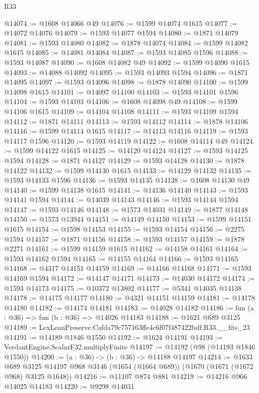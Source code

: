 \begin{lexlean}{R33}
\begin{coremodule}
@14074 := @1608 @14066 @49
@14076 := @1599 @14074 @1615
@14077 := @14072 @14076
@14079 := @1593 @14077 @1594
@14080 := @1871 @14079
@14081 := @1593 @14080
@14082 := @1878 @14074
@14084 := @1599 @14082 @1615
@14085 := @14081 @14084
@14087 := @1593 @14085 @1596
@14088 := @1593 @14087
@14090 := @1608 @14082 @49
@14092 := @1599 @14090 @1615
@14093 := @14088 @14092
@14095 := @1593 @14093 @1594
@14096 := @1871 @14095
@14097 := @1593 @14096
@14098 := @1878 @14090
@14100 := @1599 @14098 @1615
@14101 := @14097 @14100
@14103 := @1593 @14101 @1596
@14104 := @1593 @14103
@14106 := @1608 @14098 @49
@14108 := @1599 @14106 @1615
@14109 := @14104 @14108
@14111 := @1593 @14109 @1594
@14112 := @1871 @14111
@14113 := @1593 @14112
@14114 := @1878 @14106
@14116 := @1599 @14114 @1615
@14117 := @14113 @14116
@14119 := @1593 @14117 @1596
@14120 := @1593 @14119
@14122 := @1608 @14114 @49
@14124 := @1599 @14122 @1615
@14125 := @14120 @14124
@14127 := @1593 @14125 @1594
@14128 := @1871 @14127
@14129 := @1593 @14128
@14130 := @1878 @14122
@14132 := @1599 @14130 @1615
@14133 := @14129 @14132
@14135 := @1593 @14133 @1596
@14136 := @1593 @14135
@14138 := @1608 @14130 @49
@14140 := @1599 @14138 @1615
@14141 := @14136 @14140
@14143 := @1593 @14141 @1594
@14144 := @14039 @14143
@14146 := @1593 @14144 @1594
@14147 := @1593 @14146
@14148 := @1573 @14031
@14149 := @1877 @14148
@14150 := @1573 @13944
@14151 := @14149 @14150
@14153 := @1599 @14151 @1615
@14154 := @1598 @14153
@14155 := @1593 @14154
@14156 := @2275 @1594
@14157 := @1871 @14156
@14158 := @1593 @14157
@14159 := @1878 @2271
@14161 := @1599 @14159 @1615
@14162 := @14158 @14161
@14164 := @1593 @14162 @1594
@14165 := @14155 @14164
@14166 := @1593 @14165
@14168 := @4317 @14151 @14159
@14169 := @14166 @14168
@14171 := @1593 @14169 @1594
@14172 := @14147 @14171
@14173 := @14030 @14172
@14174 := @1593 @14173
@14175 := @10372 @13802
@14177 := @5341 @14035 @14138
@14178 := @14175 @14177
@14180 := @4321 @14151 @14159
@14181 := @14178 @14180
@14182 := @14174 @14181
@14183 := @14028 @14182
@14186 := fun (a : @36) => fun (b : @36) => @14026 @14183
@14188 := @1621 @689 @3125
@14189 := LexLeanPreserve.Cafda79c757163ffe4c6f07f487422bdf.R33.__fits_23
@14191 := @14189 @1846 @1550
@14192 := @1624 @14191
@14193 := VerdantEngine.ScalarF32.multiplyFinite
@14197 := @14192 (@98 (@14193 @1846 @1550))
@14200 := (a : @36) -> (b : @36) -> @14188 @14197
@14214 := @1633
    @689
    @3125
    @14197
    @968
    @3146
    (@1654 (@1664 @689))
    (@1670 (@1671 (@1672 @968) @3125 @1648))
@14216 := @11107 @874 @881
@14219 := @14216 @966 @14025 @14183
@14220 := @9298 @14031

\end{coremodule}
\end{lexlean}
